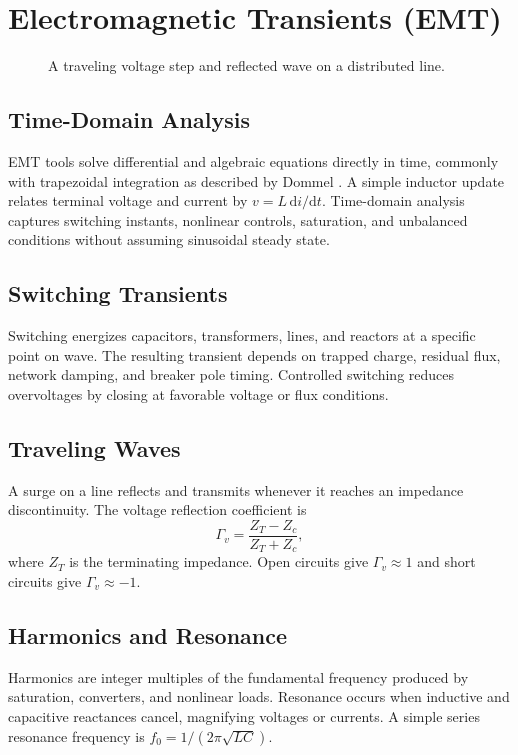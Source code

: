\documentclass[11pt]{article}
\newcommand{\dd}{\mathrm{d}}
\begin{document}
\section{Electromagnetic Transients (EMT)}
\begin{figure}[h]
\centering

\caption{A traveling voltage step and reflected wave on a distributed line.}
\end{figure}

\subsection{Time-Domain Analysis}
EMT tools solve differential and algebraic equations directly in time, commonly with trapezoidal integration as described by Dommel \cite{dommel1969}. A simple inductor update relates terminal voltage and current by $v=L\,\dd i/\dd t$. Time-domain analysis captures switching instants, nonlinear controls, saturation, and unbalanced conditions without assuming sinusoidal steady state.

\subsection{Switching Transients}
Switching energizes capacitors, transformers, lines, and reactors at a specific point on wave. The resulting transient depends on trapped charge, residual flux, network damping, and breaker pole timing. Controlled switching reduces overvoltages by closing at favorable voltage or flux conditions.

\subsection{Traveling Waves}
A surge on a line reflects and transmits whenever it reaches an impedance discontinuity. The voltage reflection coefficient is
\begin{equation}
\Gamma_v=\frac{Z_T-Z_c}{Z_T+Z_c},
\end{equation}
where $Z_T$ is the terminating impedance. Open circuits give $\Gamma_v\approx 1$ and short circuits give $\Gamma_v\approx -1$.

\subsection{Harmonics and Resonance}
Harmonics are integer multiples of the fundamental frequency produced by saturation, converters, and nonlinear loads. Resonance occurs when inductive and capacitive reactances cancel, magnifying voltages or currents. A simple series resonance frequency is $f_0=1/(2\pi\sqrt{LC})$.
\end{document}
